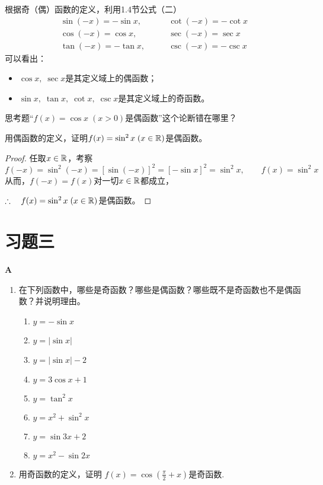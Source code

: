 根据奇（偶）函数的定义，利用1.4节公式（二）
\[\begin{split}
 \sin(-x)=-\sin x,&\qquad \cot(-x)=-\cot x\\
\cos(-x)=\cos x,&\qquad \sec(-x)=\sec x\\
\tan(-x)=-\tan x,&\qquad \csc(-x)=-\csc x   
\end{split}\]
可以看出：
\begin{itemize}
    \item $\cos x,\; \sec x$是其定义域上的偶函数；
    \item $\sin x,\; \tan x,\; \cot x,\; \csc x$是其定义域上的奇函数。
\end{itemize}

\begin{thm}
    {思考题}“$f(x)=\cos x\; (x>0)$是偶函数”这个论断错在哪里？
\end{thm}

\begin{example}
    用偶函数的定义，证明$f(x)=\sin^2 x\; (x\in\mathbb{R})$是偶函数。
\end{example}

\begin{proof}
    任取$x\in\mathbb{R}$，考察
\[f(-x)=\sin^2(-x)=[\sin(-x)]^2=[-\sin x]^2=\sin^2x,\qquad f(x)=\sin^2x\]
从而，$f(-x)=f(x)$对一切$x\in\mathbb{R}$都成立，

$\therefore\quad f(x)=\sin^2x\; (x\in\mathbb{R})$是偶函数。
\end{proof}

\section*{习题三}

\begin{center}
    \bfseries A
\end{center}
\begin{enumerate}
    \item 在下列函数中，哪些是奇函数？哪些是偶函数？哪些既不是奇函数也不是偶函数？并说明理由。
\begin{multicols}{2}
\begin{enumerate}[(1)]
    \item $y=-\sin x$
    \item $y=|\sin x|$
    \item $y=|\sin x|-2$
    \item $y=3\cos x+1$
    \item $y=\tan^2 x$
    \item $y=x^2+\sin^2 x$
    \item $y=\sin 3x+2$
    \item $y=x^2-\sin 2x$
\end{enumerate}    
\end{multicols}

\item 用奇函数的定义，证明 $f(x)=\cos\left(\frac{\pi}{2}+x\right)$是奇函数.
\end{enumerate}


